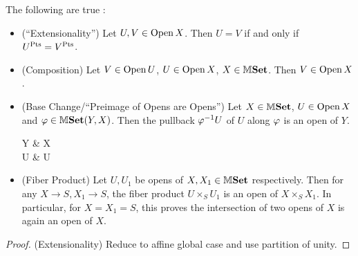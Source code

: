 \documentclass[../main.tex]{subfiles}
\begin{document}
\begin{prop}
  
  The following are true : \begin{itemize}
    \item (``Extensionality'')
    Let $U, V \in \operatorname{Open} X$.
    Then $U = V$ if and only if $U^{\mathrm{Pts}} = V^{\mathrm{Pts}}$.
    \item (Composition)
    Let $V \in \operatorname{Open} U$, $U \in \operatorname{Open} X$, $X \in \mathbb{M}\mathbf{Set}$.
    Then $V \in \operatorname{Open} X$.
    \item (Base Change/``Preimage of Opens are Opens'') 
    Let $X \in \mathbb{M}\mathbf{Set}$, $U \in \operatorname{Open} X$ and $\varphi \in \mathbb{M}\mathbf{Set}(Y,X)$.
    Then the pullback $\varphi^{-1} U$ of $U$ along $\varphi$ is 
    an open of $Y$.
    \begin{cd}
      Y \ar[r,"\ph"] & X \\
      \ph\inv U \ar[u] \ar[r] & U \ar[u]
    \end{cd}
    \item (Fiber Product)
    Let $U,U_1$ be opens of $X,X_1 \in \mathbb{M}\mathbf{Set}$ respectively.
    Then for any $X \to S, X_1 \to S$, 
    the fiber product $U \times_S U_1$ is an open of $X \times_S X_1$.
    In particular, for $X = X_1 = S$,
    this proves the intersection of two opens of $X$ is 
    again an open of $X$.
  \end{itemize}
\end{prop}
\begin{proof}
  (Extensionality) Reduce to affine global case and use partition of unity.
\end{proof}
\end{document}
